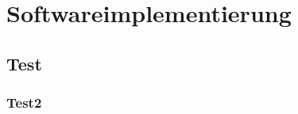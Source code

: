 \chapter{Softwareimplementierung} \label{chap:software_implementierung}

\section{Test}

\subsection{Test2}